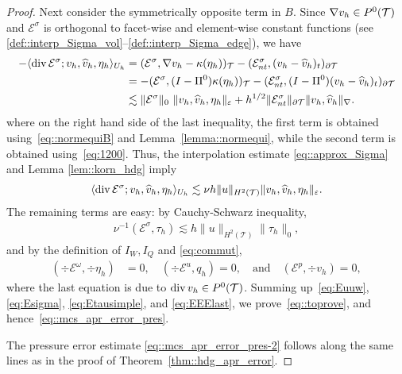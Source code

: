 \begin{proof}
  Next consider the symmetrically opposite term in $B$.
  Since $\nabla v_h\in P^0(\mathcal{T})$ and $\mathcal{E}^{\sigma}$ is orthogonal to 
  facet-wise and element-wise constant functions (see \eqref{def::interp_Sigma_vol}--\eqref{def::interp_Sigma_edge}), we have 
  \begin{align*}
    -\langle\operatorname{div} \mathcal{E}^{\sigma}; v_h, \widehat{v}_h, \eta_h\rangle_{U_h} & = (\mathcal{E}^\sigma, \nabla v_h - \kappa(\eta_h))_{\mathcal{T}} - (\mathcal{E}^\sigma_{nt}, (v_h - \widehat{v}_h)_t)_{\partial \mathcal{T}} \\
    &=  -(\mathcal{E}^\sigma, (I-\Pi^0)\kappa(\eta_h))_{\mathcal{T}} - (\mathcal{E}^\sigma_{nt}, (I-\Pi^0)(v_h - \widehat{v}_h)_t)_{\partial \mathcal{T}} \\
    &\lesssim  \|\mathcal{E}^\sigma\|_0 ~\|v_h, \widehat{v}_h, \eta_h\|_{\varepsilon} + h^{1/2}\|\mathcal{E}^\sigma_{nt}\|_{\partial \mathcal{T}} \| v_h,\widehat v_h \|_\nabla.
  \end{align*}
  where on the right hand side of the last inequality, the first term is  obtained
using~\eqref{eq::normequiB} and Lemma~\ref{lemma::normequi}, while the second term is obtained using~\eqref{eq:1200}.
  Thus, the interpolation estimate \eqref{eq::approx_Sigma}
  and Lemma \ref{lem::korn_hdg} imply
  \begin{align}
    \label{eq:Esigma}
    \langle\operatorname{div} \mathcal{E}^{\sigma}; v_h, \widehat{v}_h, \eta_h\rangle_{U_h} \lesssim \nu h \|u\|_{H^2(\mathcal{T})} \|v_h, \widehat{v}_h, \eta_h\|_{\varepsilon}.
  \end{align}
The  remaining terms are easy: by  Cauchy-Schwarz inequality, 
  \begin{align}
    \label{eq:Etausimple}
    \nu^{-1}(\mathcal{E}^\sigma, \tau_h) \lesssim  h \|u\|_{H^2(\mathcal{T})} \|\tau_h \|_0,
  \end{align}
 and by the definition of $I_W, I_Q$ and \eqref{eq:commut}, 
 \begin{align}
   \label{eq:EEElast}
    (\div \mathcal{E}^{\omega}, \div \eta_h ) &= 0,\quad 
    (\div \mathcal{E}^u, q_h) = 0, \quad \textrm{and} \quad
    (\mathcal{E}^p, \div v_h) = 0,
  \end{align}
where the last equation is due to $\operatorname{div} v_h\in P^0(\mathcal{T})$.
Summing up~\eqref{eq:Euuw},
\eqref{eq:Esigma},
\eqref{eq:Etausimple}, and 
\eqref{eq:EEElast}, we prove~\eqref{eq::toprove}, and hence~\eqref{eq::mcs_apr_error_pres}.

The pressure error estimate \eqref{eq::mcs_apr_error_pres-2} follows
along the same lines as in the proof of
Theorem~\ref{thm::hdg_apr_error}.
\qqed
\end{proof}

